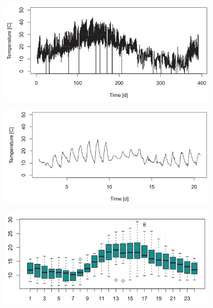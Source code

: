 			\begin{figure}[H]\centering
				\begin{minipage}[c]{0.42\textwidth}
					\includegraphics[width=1\linewidth]{images/tsAirTempFull.png}
					\label{Fig:tsAirTempFull}
				\end{minipage}
				\begin{minipage}[c]{0.42\textwidth}
					\includegraphics[width=1\linewidth]{images/tsAirTempDetail.png}
					\label{Fig:tsAirTempDetail}
				\end{minipage}
				\begin{minipage}[t]{.42\textwidth}
					\includegraphics[width=1\linewidth]{images/tsBoxPlot.png}

\end{minipage}
\end{figure}
